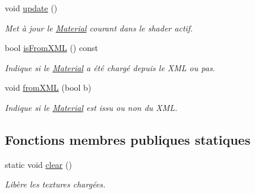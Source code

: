 \begin{DoxyCompactItemize}
void \hyperlink{class_material_a3f43fe7bcfa721fd8156adb151adf45c}{update} ()
\begin{DoxyCompactList}\small\item\em Met à jour le \hyperlink{class_material}{Material} courant dans le shader actif. \end{DoxyCompactList}\item 
bool \hyperlink{class_material_a3641da3931be722a809b13f882e2a703}{is\+From\+X\+M\+L} () const 
\begin{DoxyCompactList}\small\item\em Indique si le \hyperlink{class_material}{Material} a été chargé depuis le X\+M\+L ou pas. \end{DoxyCompactList}\item 
void \hyperlink{class_material_a806be90008bdccd18e0d657ac75ef61c}{from\+X\+M\+L} (bool b)
\begin{DoxyCompactList}\small\item\em Indique si le \hyperlink{class_material}{Material} est issu ou non du X\+M\+L. \end{DoxyCompactList}\end{DoxyCompactItemize}
\subsection*{Fonctions membres publiques statiques}
\begin{DoxyCompactItemize}
\item 
static void \hyperlink{class_material_ab350dd584b850dfc3e0c52201b5699e0}{clear} ()
\begin{DoxyCompactList}\small\item\em Libère les textures chargées. \end{DoxyCompactList}\end{DoxyCompactItemize}
